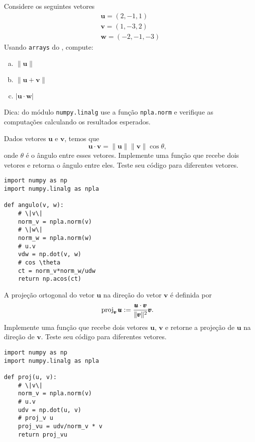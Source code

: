 \begin{exer}
  Considere os seguintes vetores
  \begin{align}
    &\pmb{u} = (2, -1, 1)\\
    &\pmb{v} = (1, -3, 2)\\
    &\pmb{w} = (-2, -1, -3)
  \end{align}
  Usando \lstinline+arrays+ do {\numpy}, compute:
  \begin{enumerate}[a)]
  \item $\|\pmb{u}\|$
  \item $\|\pmb{u} + \pmb{v}\|$
  \item $|\pmb{u}\cdot \pmb{w}|$
  \end{enumerate}
\end{exer}
\begin{resp}
  Dica: do módulo \lstinline+numpy.linalg+ use a função \lstinline+npla.norm+ e verifique as computações calculando os resultados esperados.
\end{resp}

\begin{exer}
  Dados vetores $\pmb{u}$ e $\pmb{v}$, temos que
  \begin{equation}
    \pmb{u}\cdot\pmb{v} = \|\pmb{u}\|\|\pmb{v}\|\cos\theta,
  \end{equation}
  onde $\theta$ é o ângulo entre esses vetores. Implemente uma função que recebe dois vetores e retorna o ângulo entre eles. Teste seu código para diferentes vetores.
\end{exer}
\begin{resp}

\begin{lstlisting}
import numpy as np
import numpy.linalg as npla

def angulo(v, w):
    # \|v\|
    norm_v = npla.norm(v)
    # \|w\|
    norm_w = npla.norm(w)
    # u.v
    vdw = np.dot(v, w)
    # cos \theta
    ct = norm_v*norm_w/udw
    return np.acos(ct)
\end{lstlisting}

\end{resp}

\begin{exer}
  A projeção ortogonal do vetor $\pmb{u}$ na direção do vetor $\pmb{v}$ é definida por
  \begin{equation}
    \operatorname{proj}_{\pmb{v}} \pmb{u} := \frac{\pmb{u}\cdot\pmb{v}}{\|\pmb{v}\|^2}\pmb{v}.
  \end{equation}
  Implemente uma função que recebe dois vetores $\pmb{u}$, $\pmb{v}$ e retorne a projeção de $\pmb{u}$ na direção de $\pmb{v}$. Teste seu código para diferentes vetores.
\end{exer}
\begin{resp}

\begin{lstlisting}
import numpy as np
import numpy.linalg as npla

def proj(u, v):
    # \|v\|
    norm_v = npla.norm(v)
    # u.v
    udv = np.dot(u, v)
    # proj_v u
    proj_vu = udv/norm_v * v
    return proj_vu
\end{lstlisting}

\end{resp}

